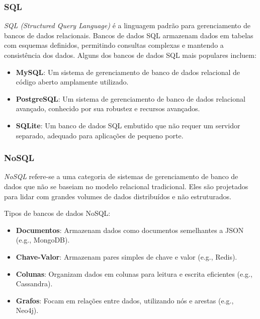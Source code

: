 \subsubsection{SQL}

\emph{SQL (Structured Query Language)} é a linguagem padrão para gerenciamento de bancos de dados relacionais. Bancos de dados SQL armazenam dados em tabelas com esquemas definidos, permitindo consultas complexas e mantendo a consistência dos dados. Alguns dos bancos de dados SQL mais populares incluem:

\begin{itemize}
    \item \textbf{MySQL}: Um sistema de gerenciamento de banco de dados relacional de código aberto amplamente utilizado.
    \item \textbf{PostgreSQL}: Um sistema de gerenciamento de banco de dados relacional avançado, conhecido por sua robustez e recursos avançados.
    \item \textbf{SQLite}: Um banco de dados SQL embutido que não requer um servidor separado, adequado para aplicações de pequeno porte.
\end{itemize}

\subsubsection{NoSQL}

\emph{NoSQL} refere-se a uma categoria de sistemas de gerenciamento de banco de dados que não se baseiam no modelo relacional tradicional. Eles são projetados para lidar com grandes volumes de dados distribuídos e não estruturados.

Tipos de bancos de dados NoSQL:

\begin{itemize}
    \item \textbf{Documentos}: Armazenam dados como documentos semelhantes a JSON (e.g., MongoDB).
    \item \textbf{Chave-Valor}: Armazenam pares simples de chave e valor (e.g., Redis).
    \item \textbf{Colunas}: Organizam dados em colunas para leitura e escrita eficientes (e.g., Cassandra).
    \item \textbf{Grafos}: Focam em relações entre dados, utilizando nós e arestas (e.g., Neo4j).
\end{itemize}



